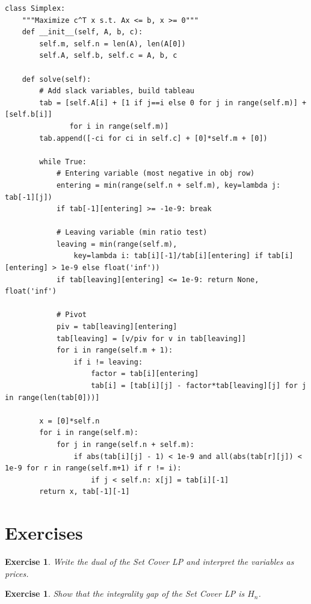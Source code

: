 \documentclass[11pt,oneside]{book}
\newtheorem{exercise}[theorem]{Exercise}
\begin{document}
\begin{lstlisting}[style=python, caption=Simplex for Small LPs]
class Simplex:
    """Maximize c^T x s.t. Ax <= b, x >= 0"""
    def __init__(self, A, b, c):
        self.m, self.n = len(A), len(A[0])
        self.A, self.b, self.c = A, b, c
    
    def solve(self):
        # Add slack variables, build tableau
        tab = [self.A[i] + [1 if j==i else 0 for j in range(self.m)] + [self.b[i]]
               for i in range(self.m)]
        tab.append([-ci for ci in self.c] + [0]*self.m + [0])
        
        while True:
            # Entering variable (most negative in obj row)
            entering = min(range(self.n + self.m), key=lambda j: tab[-1][j])
            if tab[-1][entering] >= -1e-9: break
            
            # Leaving variable (min ratio test)
            leaving = min(range(self.m), 
                key=lambda i: tab[i][-1]/tab[i][entering] if tab[i][entering] > 1e-9 else float('inf'))
            if tab[leaving][entering] <= 1e-9: return None, float('inf')
            
            # Pivot
            piv = tab[leaving][entering]
            tab[leaving] = [v/piv for v in tab[leaving]]
            for i in range(self.m + 1):
                if i != leaving:
                    factor = tab[i][entering]
                    tab[i] = [tab[i][j] - factor*tab[leaving][j] for j in range(len(tab[0]))]
        
        x = [0]*self.n
        for i in range(self.m):
            for j in range(self.n + self.m):
                if abs(tab[i][j] - 1) < 1e-9 and all(abs(tab[r][j]) < 1e-9 for r in range(self.m+1) if r != i):
                    if j < self.n: x[j] = tab[i][-1]
        return x, tab[-1][-1]
\end{lstlisting}

\section{Exercises}
\begin{exercise}
Write the dual of the Set Cover LP and interpret the variables as prices.
\end{exercise}
\begin{exercise}
Show that the integrality gap of the Set Cover LP is $H_n$.
\end{exercise}

\setcounter{chapter}{12}
\end{document}

